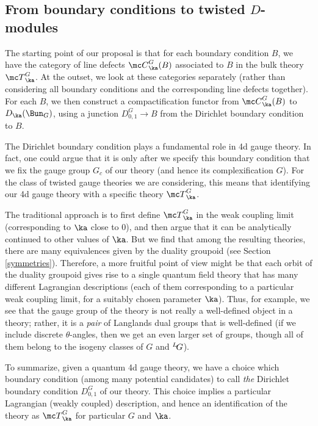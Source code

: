 \documentclass[11pt,reqno]{amsart}
\theoremstyle{plain}
\numberwithin{equation}{section}
\def\neg{\negthinspace}
\def\LG{{}^L\neg G}
\theoremstyle{definition}
\begin{document}
\subsection{From boundary conditions to twisted
  $D$-modules}    \label{bc to D}

The starting point of our proposal is that for each boundary condition
$B$, we have the category of line defects ${\mc C}^G_\ka(B)$
associated to $B$ in the bulk theory ${\mc T}^G_\ka$. At the outset,
we look at these categories separately (rather than considering all
boundary conditions and the corresponding line defects together). For
each $B$, we then construct a compactification functor from ${\mc
  C}^G_\ka(B)$ to $D_\ka(\Bun_G)$, using a junction $D^G_{0,1} \to B$
from the Dirichlet boundary condition to $B$.

The Dirichlet boundary condition plays a fundamental role in 4d gauge
theory. In fact, one could argue that it is only after we specify this
boundary condition that we fix the gauge group $G_c$ of our theory
(and hence its complexification $G$). For the class of twisted gauge
theories we are considering, this means that identifying our 4d gauge
theory with a specific theory ${\mc T}^G_\ka$.

The traditional approach is to first define ${\mc T}^G_\ka$ in the
weak coupling limit (corresponding to $\ka$ close to $0$), and then
argue that it can be analytically continued to other values of
$\ka$. But we find that among the resulting theories, there are many
equivalences given by the duality groupoid (see Section
\ref{symmetries}). Therefore, a more fruitful point of view might be
that each orbit of the duality groupoid gives rise to a single quantum
field theory that has many different Lagrangian descriptions (each of
them corresponding to a particular weak coupling limit, for a suitably
chosen parameter $\ka$). Thus, for example, we see that the gauge
group of the theory is not really a well-defined object in a theory;
rather, it is a {\em pair} of Langlands dual groups that is
well-defined (if we include discrete $\theta$-angles, then we get an
even larger set of groups, though all of them belong to the isogeny
classes of $G$ and $\LG$).

To summarize, given a quantum 4d gauge theory, we have a choice which
boundary condition (among many potential candidates) to call {\em the}
Dirichlet boundary condition $D^G_{0,1}$ of our theory. This choice
implies a particular Lagrangian (weakly coupled) description, and
hence an identification of the theory as ${\mc T}^G_\ka$ for
particular $G$ and $\ka$.
\end{document}
